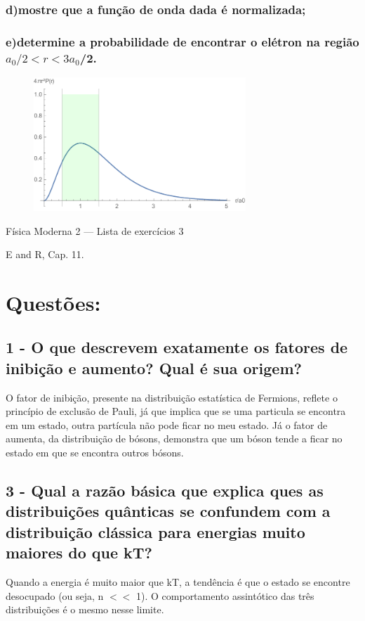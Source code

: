 \documentclass{article}
\begin{document}
\subsubsection{d)mostre que a função de onda dada é normalizada;}
\subsubsection{e)determine a probabilidade de encontrar o elétron na região $a_0/2<r<3a_0$/2.
}
\begin{figure}[H]
\centering
\includegraphics[width = 8cm]{item3e.pdf}
\end{figure}
Física Moderna 2 — Lista de exercícios 3

E and R, Cap. 11.
\section{Questões:}
\subsection{1 - O que descrevem exatamente os fatores de inibição e aumento? Qual é sua origem?}

O fator de inibição, presente na distribuição estatística de Fermions, reflete o princípio de exclusão de Pauli, já que implica que se uma particula se encontra em um estado, outra partícula não pode ficar no meu estado.
Já o fator de aumenta, da distribuição de bósons, demonstra que um bóson tende a ficar no estado em que se encontra outros bósons.


\subsection{3 - Qual a razão básica que explica ques as distribuições quânticas se confundem com a distribuição clássica para energias muito maiores do que kT?}
Quando a energia é muito maior que kT, a tendência é que o estado se encontre desocupado (ou seja, n $<<$ 1). O comportamento assintótico das três distribuições é o mesmo nesse limite.
\end{document}
